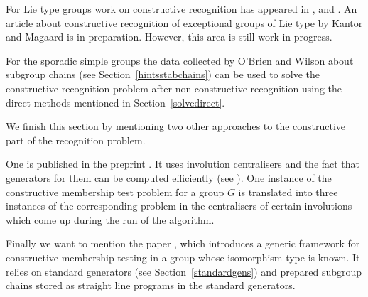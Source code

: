 For Lie type groups work on constructive recognition has appeared in
\cite{recogSL3}, \cite{rybaid} and \cite{suzukiconstr}. An article about 
constructive recognition of exceptional groups of Lie type by Kantor and Magaard is
in preparation. However, this area is still work in progress.

For the sporadic simple groups the data collected by O'Brien and Wilson
about subgroup chains (see Section~\ref{hintsstabchains}) can be used to
solve the constructive recognition problem after non-con\-struc\-tive
recognition using the direct methods mentioned in
Section~\ref{solvedirect}. 

We finish this section by mentioning two other approaches to the
constructive part of the recognition problem.

One is published
in the preprint \cite{bbconstrmember}. It uses involution centralisers
and the fact that generators for them can be computed efficiently (see
\cite{BrayInv}). One instance of the constructive membership test problem
for a group $G$ is translated into three instances of the corresponding
problem in the centralisers of certain involutions which come up during the
run of the algorithm.

Finally we want to mention the paper \cite{gensift}, which introduces a
generic framework for constructive membership testing in a group whose
isomorphism type is known. It relies on standard generators (see
Section~\ref{standardgens}) and prepared subgroup chains stored as straight
line programs in the standard generators.
%

